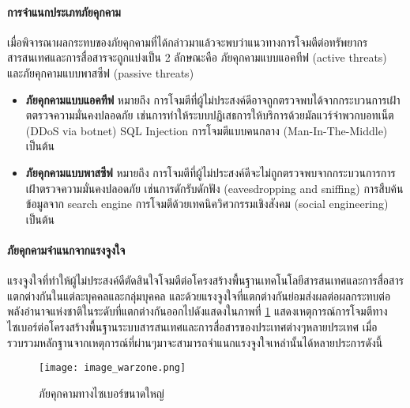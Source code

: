\documentclass[../th_cyber_warfare_distilled.tex]{subfiles}
\begin{document}
\paragraph{การจำแนกประเภทภัยคุกคาม}
เมื่อพิจารณาผลกระทบของภัยคุกคามที่ได้กล่าวมาแล้วจะพบว่าแนวทางการโจมตีต่อทรัพยากรสารสนเทศและการสื่อสารจะถูกแบ่งเป็น 2 ลักษณะคือ ภัยคุกคามแบบแอคทีฟ (active threats) และภัยคุกคามแบบพาสซีฟ (passive threats)
\begin{itemize}
	\item \textbf{ภัยคุกคามแบบแอคทีฟ} หมายถึง การโจมตีที่ผู้ไม่ประสงค์ดีอาจถูกตรวจพบได้จากกระบวนการเฝ้าตตรวจความมั่นคงปลอดภัย เช่นการทำให้ระบบปฏิเสธการให้บริการด้วยมัลแวร์จำพวกบอทเน็ต (DDoS via botnet) SQL Injection การโจมตีแบบคนกลาง (Man-In-The-Middle) เป็นต้น
	\item \textbf{ภัยคุกคามแบบพาสซีฟ} หมายถึง การโจมตีที่ผู้ไม่ประสงค์ดีจะไม่ถูกตรวจพบจากกระบวนการการเฝ้าตรวจความมั่นคงปลอดภัย เช่นการดักรับดักฟัง (eavesdropping and sniffing) การสืบค้นข้อมูลจาก search engine การโจมตีด้วยเทคนิควิศวกรรมเชิงสังคม (social engineering) เป็นต้น 
\end{itemize}

\paragraph{ภัยคุกคามจำแนกจากแรงจูงใจ}

แรงจูงใจที่ทำให้ผู้ไม่ประสงค์ดีตัดสินใจโจมตีต่อโครงสร้างพื้นฐานเทคโนโลยีสารสนเทศและการสื่อสารแตกต่างกันในแต่ละบุคคลและกลุ่มบุคคล และด้วยแรงจูงใจที่แตกต่างกันย่อมส่งผลต่อผลกระทบต่อพลังอำนาจแห่งชาติในระดับที่แตกต่างกันออกไปดังแสดงในภาพที่ \ref{figure:cyber_incident} แสดงเหตุการณ์การโจมตีทางไซเบอร์ต่อโครงสร้างพื้นฐานระบบสารสนเทศและการสื่อสารของประเทศต่างๆหลายประเทศ เมื่อรวบรวมหลักฐานจากเหตุการณ์ที่ผ่านๆมาจะสามารถจำแนกแรงจูงใจเหล่านั้นได้หลายประการดังนี้


\begin{figure}
	\texttt{[image: image\_warzone.png]}
	\centering
	\caption{ภัยคุกคามทางไซเบอร์ขนาดใหญ่}
	\label{figure:cyber_incident}
\end{figure}
\end{document}
